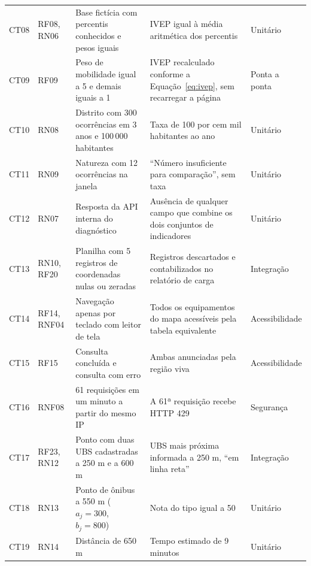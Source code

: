\begin{longtable}{C{1.1cm}C{1.8cm}L{4.6cm}L{4.4cm}C{1.8cm}}
	CT08        & RF08, RN06         & Base fictícia com percentis conhecidos e pesos iguais        & IVEP igual à média aritmética dos percentis                                & Unitário       \\
	CT09        & RF09               & Peso de mobilidade igual a 5 e demais iguais a 1             & IVEP recalculado conforme a Equação~\ref{eq:ivep}, sem recarregar a página & Ponta a ponta  \\
	CT10        & RN08               & Distrito com 300 ocorrências em 3 anos e 100\,000 habitantes & Taxa de 100 por cem mil habitantes ao ano                                  & Unitário       \\
	CT11        & RN09               & Natureza com 12 ocorrências na janela                        & ``Número insuficiente para comparação'', sem taxa                          & Unitário       \\
	CT12        & RN07               & Resposta da API interna do diagnóstico                       & Ausência de qualquer campo que combine os dois conjuntos de indicadores    & Unitário       \\
	CT13        & RN10, RF20         & Planilha com 5 registros de coordenadas nulas ou zeradas     & Registros descartados e contabilizados no relatório de carga               & Integração     \\
	CT14        & RF14, RNF04        & Navegação apenas por teclado com leitor de tela              & Todos os equipamentos do mapa acessíveis pela tabela equivalente           & Acessibilidade \\
	CT15        & RF15               & Consulta concluída e consulta com erro                       & Ambas anunciadas pela região viva                                          & Acessibilidade \\
	CT16        & RNF08              & 61 requisições em um minuto a partir do mesmo IP             & A 61ª requisição recebe HTTP 429                                           & Segurança      \\
	CT17        & RF23, RN12         & Ponto com duas UBS cadastradas a 250 m e a 600 m             & UBS mais próxima informada a 250 m, ``em linha reta''                      & Integração     \\
	CT18        & RN13               & Ponto de ônibus a 550 m ($a_j = 300$, $b_j = 800$)           & Nota do tipo igual a 50                                                    & Unitário       \\
	CT19        & RN14               & Distância de 650 m                                           & Tempo estimado de 9 minutos                                                & Unitário       \\

\end{longtable}

